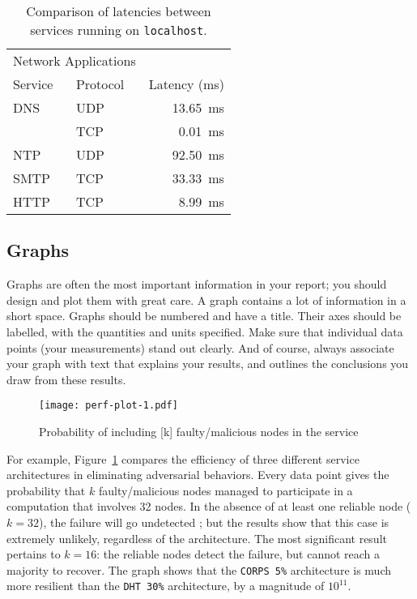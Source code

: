 \documentclass{scrartcl}
\begin{document}
\begin{table}[ht]
    \centering
    \begin{tabular}{llr}
\hline
\multicolumn{2}{c}{Network Applications} \\
\cline{1-2}
Service    & Protocol & Latency (\si{\ms}) \\
\hline
DNS         & UDP       & \SI{13.65}{\ms}      \\
            & TCP       & \SI{0.01}{\ms}       \\
NTP         & UDP       & \SI{92.50}{\ms}      \\
SMTP        & TCP       & \SI{33.33}{\ms}      \\
HTTP        & TCP       & \SI{8.99}{\ms}       \\
\hline
\end{tabular}
    \caption{Comparison of latencies between services running on \texttt{localhost}.}
    \label{tab:my_label}
\end{table}

\subsection{Graphs}

Graphs are often the most important information in your report; you should design and plot them with great care. A graph contains a lot of information in a short space. Graphs should be numbered and have a title. Their axes should be labelled, with the quantities and units specified. Make sure that individual data points (your measurements) stand out clearly. And of course, always associate your graph with text that explains your results, and outlines the conclusions you draw from these results.

\begin{figure}
	\begin{center}
		\texttt{[image: perf-plot-1.pdf]}
	\end{center}
	\caption{Probability of including [k] faulty/malicious nodes in the service}
	\label{graph:faulty-proportion-plot}
\end{figure}

For example, Figure~\ref{graph:faulty-proportion-plot} compares the efficiency of three different service architectures in eliminating adversarial behaviors. Every data point gives the probability that $k$ faulty/malicious nodes managed to participate in a computation that involves 32 nodes. In the absence of at least one reliable node ($k = 32$), the failure will go undetected ; but the results show that this case is extremely unlikely, regardless of the architecture. The most significant result pertains to $k = 16$: the reliable nodes detect the failure, but cannot reach a majority to recover. The graph shows that the \texttt{CORPS 5\%} architecture is much more resilient than the \texttt{DHT 30\%} architecture, by a magnitude of $10^{11}$.
\end{document}

